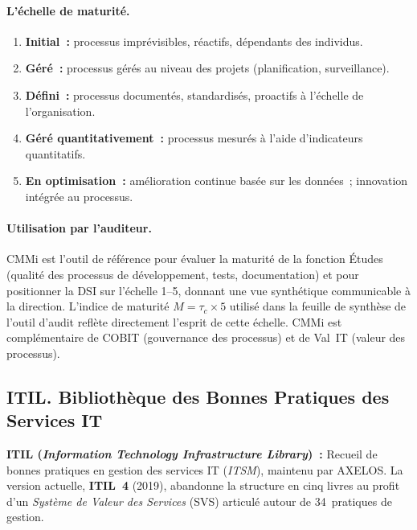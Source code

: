 \paragraph{L'échelle de maturité.}
\begin{enumerate}
    \item \textbf{Initial~:} processus imprévisibles, réactifs, dépendants des individus.
    \item \textbf{Géré~:} processus gérés au niveau des projets (planification, surveillance).
    \item \textbf{Défini~:} processus documentés, standardisés, proactifs à l'échelle de
        l'organisation.
    \item \textbf{Géré quantitativement~:} processus mesurés à l'aide d'indicateurs
        quantitatifs.
    \item \textbf{En optimisation~:} amélioration continue basée sur les données~; innovation
        intégrée au processus.
\end{enumerate}

\paragraph{Utilisation par l'auditeur.} CMMi est l'outil de référence pour évaluer la maturité
de la fonction Études (qualité des processus de développement, tests, documentation) et pour
positionner la DSI sur l'échelle 1--5, donnant une vue synthétique communicable à la direction.
L'indice de maturité $M = \tau_c \times 5$ utilisé dans la feuille de synthèse de l'outil d'audit
reflète directement l'esprit de cette échelle. CMMi est complémentaire de COBIT (gouvernance des
processus) et de Val~IT (valeur des processus).

\subsection{ITIL. Bibliothèque des Bonnes Pratiques des Services IT}
\label{subsec:itil}

\begin{boxdef}
\textbf{ITIL (\emph{Information Technology Infrastructure Library})~:} Recueil de bonnes
pratiques en gestion des services IT (\emph{ITSM}), maintenu par AXELOS. La version
actuelle, \textbf{ITIL~4} (2019), abandonne la structure en cinq livres au profit d'un
\emph{Système de Valeur des Services} (SVS) articulé autour de 34~pratiques de gestion.
\end{boxdef}

